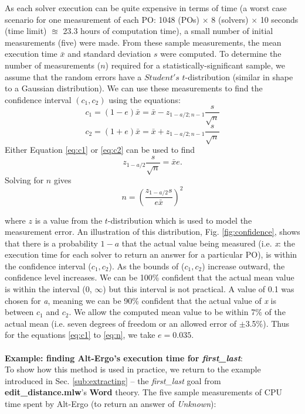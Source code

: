 As each solver execution can be quite expensive in terms of time (a worst case scenario for one measurement of each PO: 1048 (POs) $\times$ 8 (solvers) $\times$ 10 seconds (time limit) $\approxeq$ 23.3 hours of computation time), a small number of initial measurements (five) were made.
From these sample measurements, the mean execution time $\bar{x}$ and standard deviation $s$ were computed. 
To determine the number of measurements ($n$) required for a statistically-significant sample, we assume that the random errors have a $Student's$ $t$-distribution (similar in shape to a Gaussian distribution). 
We can use these measurements to find the confidence interval $(c_1, c_2)$ using the equations:
\begin{equation}
	c_1=(1-e)\bar{x} = \bar{x}-z_{1-a/2;n-1}\frac{s}{\sqrt{n}} 
	\label{eq:c1}
\end{equation}
\begin{equation}
	c_2=(1+e)\bar{x} = \bar{x}+z_{1-a/2;n-1}\frac{s}{\sqrt{n}}
	\label{eq:c2}
\end{equation}
Either Equation \ref{eq:c1} or \ref{eq:c2} can be used to find 
\begin{equation}
	z_{1-a/2}\frac{s}{\sqrt{n}} = \bar{x}e.
	\label{eq:simp}
\end{equation}
Solving for $n$ gives
\begin{equation}
	n =
	 \left(\frac{z_{1-a/2}s}{e\bar{x}}\right)^2
	\label{eq:n}
\end{equation}
  
where $z$ is a value from the $t$-distribution which is used to model the measurement error. 
An illustration of this distribution, Fig. \ref{fig:confidence}, shows that there is a probability $1-a$ that the actual value being measured (i.e. \textit{x}: the execution time for each solver to return an answer for a particular PO), is within the confidence interval ($c_1, c_2$). 
As the bounds of ($c_1, c_2$) increase outward, the confidence level increases.
We can be 100\% confident that the actual mean value is within the interval (0, $\infty$) but this interval is not practical.  
A value of 0.1 was chosen for \textit{a}, meaning we can be 90\% confident that the actual value of \textit{x} is between $c_1$ and $c_2$. 
We allow the computed mean value to be within 7\% of the actual mean (i.e. seven degrees of freedom or an allowed error of $\pm$3.5\%). Thus for the equations \ref{eq:c1} to \ref{eq:n}, we take $e = 0.035$.  \\ 
\\
\textbf{Example: finding Alt-Ergo's execution time for \textit{first\_last}}: \\
To show how this method is used in practice, we return to the example introduced in Sec. \ref{sub:extracting} -- the \textit{first\_last} goal from \textbf{edit\_distance.mlw}'s \textbf{Word} theory.
The five sample measurements of CPU time spent by Alt-Ergo (to return an answer of \textit{Unknown}):

